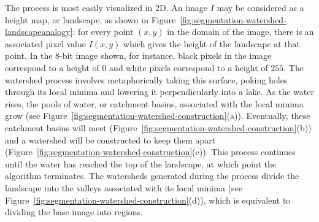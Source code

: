 The process is most easily visualized in 2D. An image $I$ may be considered as a height map, or landscape, as shown in Figure~\ref{fig:segmentation-watershed-landscapeanalogy}: for every point $(x,y)$ in the domain of the image, there is an associated pixel value $I(x,y)$ which gives the height of the landscape at that point. In the 8-bit image shown, for instance, black pixels in the image correspond to a height of $0$ and white pixels correspond to a height of $255$. The watershed process involves metaphorically taking this surface, poking holes through its local minima and lowering it perpendicularly into a lake. As the water rises, the pools of water, or catchment basins, associated with the local minima grow (see Figure~\ref{fig:segmentation-watershed-construction}(a)). Eventually, these catchment basins will meet (Figure~\ref{fig:segmentation-watershed-construction}(b)) and a watershed will be constructed to keep them apart (Figure~\ref{fig:segmentation-watershed-construction}(c)). This process continues until the water has reached the top of the landscape, at which point the algorithm terminates. The watersheds generated during the process divide the landscape into the valleys associated with its local minima (see Figure~\ref{fig:segmentation-watershed-construction}(d)), which is equivalent to dividing the base image into regions.


